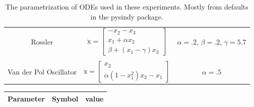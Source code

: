 \documentclass{article}
\renewcommand{\vec}[1]{\boldsymbol{\mathrm{#1}}}
\begin{document}
\begin{table}[ht]
\begin{tabular}{c c c}
        Rossler
            & $\dot {\vec x} = \left[\begin{matrix}
                -x_2 - x_3 \\
                x_1 + \alpha x_2\\
                \beta + (x_1 - \gamma) x_3
            \end{matrix}\right]$
            & $\alpha = .2$, $\beta=.2 $, $\gamma=5.7$\\\\
        Van der Pol Oscillator
            & $\dot {\vec x} = \left[\begin{matrix}
                x_2 \\
                \alpha(1 - x_1^2) x_2 - x_1
            \end{matrix}\right]$
        & $\alpha = .5$
    \end{tabular}
    \caption{The parametrization of ODEs used in these experiments.  Mostly from defaults in the pysindy package.}
\end{table}

\begin{table}
    \label{tab:exp-params}
    \begin{tabular}{c c c}
        Parameter & Symbol & value\\
        \hline
    \end{tabular}
\end{table}



\end{document}
